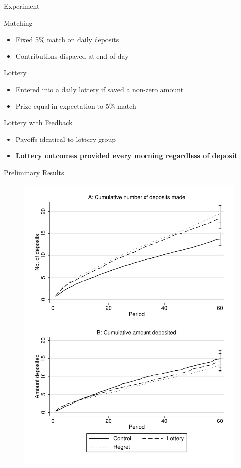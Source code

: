 \documentclass[aspectratio=169]{beamer}
\begin{document}
\begin{frame}{Experiment}

	\begin{block}{Matching}
		\begin{itemize}
		\item Fixed 5\% match on daily deposits
		\item Contributions dispayed at end of day
		\end{itemize}
	\end{block}

	\begin{block}{Lottery}
		\begin{itemize}
		\item Entered into a daily lottery if saved a non-zero amount
		\item Prize equal in expectation to 5\% match
		\end{itemize}
	\end{block}

	\begin{block}{Lottery with Feedback}
		\begin{itemize}
		\item Payoffs identical to lottery group
		\item \textbf{Lottery outcomes provided every morning regardless of deposit}
		\end{itemize}
	\end{block}

\end{frame}

\begin{frame}{Preliminary Results}

	\begin{figure}[H]
		\centering
		\includegraphics[width=0.35\linewidth]{line-cumdeposits.pdf}
	\end{figure}

\end{frame}
\end{document}
